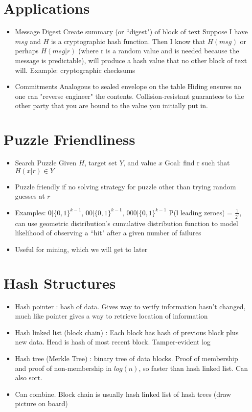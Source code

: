 \documentclass{article}
\begin{document}
\section*{Applications}
\begin{itemize}
\item Message Digest
\subitem Create summary (or ``digest") of block of text
\subitem Suppose I have $msg$ and $H$ is a cryptographic hash function. Then I know that $H(msg)$ or perhaps $H(msg|r)$ (where r is a random value and is needed because the message is predictable), will produce a hash value that no other block of text will.
\subitem Example: cryptographic checksums
\item Commitments
\subitem Analogous to sealed envelope on the table
\subitem Hiding ensures no one can "reverse engineer" the contents. Collision-resistant guarantees to the other party that you are bound to the value you initially put in.
\end{itemize}

\section*{Puzzle Friendliness}
\begin{itemize}
\item Search Puzzle
\subitem Given $H$, target set $Y$, and value $x$
\subitem Goal: find r such that $H(x|r) \in Y$
\item Puzzle friendly if no solving strategy for puzzle other than trying random guesses at $r$
\item Examples: $0|\{0,1\}^{k-1}$, $00|\{0,1\}^{k-1}$, $000|\{0,1\}^{k-1}$
\subitem P(l leading zeroes) = $\frac{1}{2^l}$, can use geometric distribution's cumulative distribution function to model likelihood of observing a ``hit" after a given number of failures
\item Useful for mining, which we will get to later
\end{itemize}

\section*{Hash Structures}
\begin{itemize}
\item Hash pointer : hash of data. Gives way to verify information hasn't changed, much like pointer gives a way to retrieve location of information
\item Hash linked list (block chain) : Each block has hash of previous block plus new data. Head is hash of most recent block.
\subitem Tamper-evident log
\item Hash tree (Merkle Tree) : binary tree of data blocks. Proof of membership and proof of non-membership in $log(n)$, so faster than hash linked list. Can also sort.
\item Can combine. Block chain is usually hash linked list of hash trees  (draw picture on board)
\end{itemize}
\end{document}
